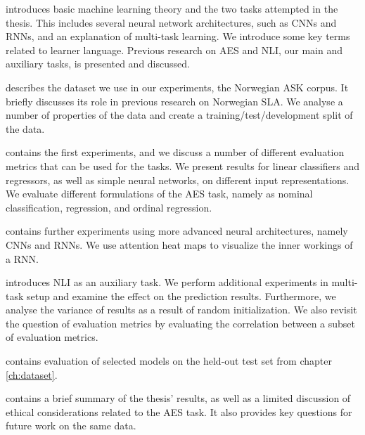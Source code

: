 \begin{description}[style=unboxed,leftmargin=0cm]
\item [Chapter \ref{ch:background}]
  introduces basic machine learning theory and the two tasks attempted in the
  thesis. This includes several neural network architectures, such as
  \acp{CNN} and \acp{RNN}, and an explanation of multi-task learning. We
  introduce some key terms related to learner language. Previous research on
  \ac{AES} and \ac{NLI}, our main and auxiliary tasks, is presented and
  discussed.

\item [Chapter \ref{ch:dataset}]
  describes the dataset we use in our experiments, the Norwegian ASK corpus.
  It briefly discusses its role in previous research on Norwegian \ac{SLA}.
  We analyse a number of properties of the data and create a
  training/test/development split of the data.

\item [Chapter \ref{ch:experiments}]
  contains the first experiments, and we discuss a number of different
  evaluation metrics that can be used for the tasks. We present results for
  linear classifiers and regressors, as well as simple neural networks, on
  different input representations. We evaluate different formulations of the
  \ac{AES} task, namely as nominal classification, regression, and ordinal
  regression.

\item [Chapter \ref{ch:sequencemodels}]
  contains further experiments using more advanced neural architectures,
  namely \acp{CNN} and \acp{RNN}. We use attention heat maps to visualize the
  inner workings of a RNN.

\item [Chapter \ref{ch:multitask}]
  introduces \ac{NLI} as an auxiliary task. We perform additional experiments
  in multi-task setup and examine the effect on the prediction results.
  Furthermore, we analyse the variance of results as a result of random
  initialization. We also revisit the question of evaluation metrics by
  evaluating the correlation between a subset of evaluation metrics.

\item [Chapter \ref{ch:heldout}]
  contains evaluation of selected models on the held-out test set from
  chapter \ref{ch:dataset}.

\item [Chapter \ref{ch:conclusion}]
  contains a brief summary of the thesis' results, as well as a limited
  discussion of ethical considerations related to the \ac{AES} task. It
  also provides key questions for future work on the same data.
\end{description}

\acresetall
